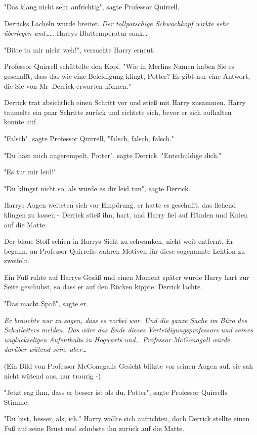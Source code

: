{"Das klang nicht sehr aufrichtig", sagte Professor Quirrell.

Derricks Lächeln wurde breiter. \emph{Der tollpatschige Schwachkopf wirkte sehr überlegen und}…… Harrys Bluttemperatur sank…

"Bitte tu mir nicht weh!", versuchte Harry erneut.

Professor Quirrell schüttelte den Kopf. "Wie in Merlins Namen haben Sie es geschafft, dass das wie eine Beleidigung klingt, Potter? Es gibt nur eine Antwort, die Sie von Mr~Derrick erwarten können."

Derrick trat absichtlich einen Schritt vor und stieß mit Harry zusammen. Harry taumelte ein paar Schritte zurück und richtete sich, bevor er sich aufhalten konnte auf.

"Falsch", sagte Professor Quirrell, "falsch, falsch, falsch."

"Du hast mich angerempelt, Potter", sagte Derrick. "Entschuldige dich."

"Es tut mir leid!"

"Du klingst nicht so, als würde es dir leid tun", sagte Derrick.

Harrys Augen weiteten sich vor Empörung, er hatte es geschafft, das flehend klingen zu lassen - Derrick stieß ihn, hart, und Harry fiel auf Händen und Knien auf die Matte.

Der blaue Stoff schien in Harrys Sicht zu schwanken, nicht weit entfernt. Er begann, an Professor Quirrells wahren Motiven für diese sogenannte Lektion zu zweifeln.

Ein Fuß ruhte auf Harrys Gesäß und einen Moment später wurde Harry hart zur Seite geschubst, so dass er auf den Rücken kippte. Derrick lachte.

"Das macht Spaß", sagte er.

\emph{Er brauchte nur zu sagen, dass es vorbei war. Und die ganze Sache im Büro des Schulleiters melden. Das wäre das Ende dieses Verteidigungsprofessors und seines unglückseligen Aufenthalts in Hogwarts und… Professor McGonagall würde darüber wütend sein, aber…}

(Ein Bild von Professor McGonagalls Gesicht blitzte vor seinen Augen auf, sie sah nicht wütend aus, nur traurig -)

"Jetzt sag ihm, dass er besser ist als du, Potter", sagte Professor Quirrells Stimme.

"Du bist, besser, als, ich." Harry wollte sich aufrichten, doch Derrick stellte einen Fuß auf seine Brust und schubste ihn zurück auf die Matte.

}
